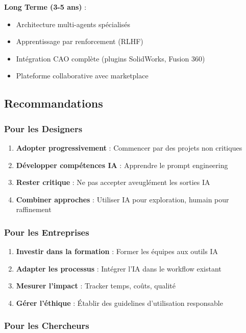 \textbf{Long Terme (3-5 ans)} :
\begin{itemize}[leftmargin=*]
    \item Architecture multi-agents spécialisés
    \item Apprentissage par renforcement (RLHF)
    \item Intégration CAO complète (plugins SolidWorks, Fusion 360)
    \item Plateforme collaborative avec marketplace
\end{itemize}

\subsection{Recommandations}

\subsubsection{Pour les Designers}

\begin{enumerate}[leftmargin=*]
    \item \textbf{Adopter progressivement} : Commencer par des projets non critiques
    \item \textbf{Développer compétences IA} : Apprendre le prompt engineering
    \item \textbf{Rester critique} : Ne pas accepter aveuglément les sorties IA
    \item \textbf{Combiner approches} : Utiliser IA pour exploration, humain pour raffinement
\end{enumerate}

\subsubsection{Pour les Entreprises}

\begin{enumerate}[leftmargin=*]
    \item \textbf{Investir dans la formation} : Former les équipes aux outils IA
    \item \textbf{Adapter les processus} : Intégrer l'IA dans le workflow existant
    \item \textbf{Mesurer l'impact} : Tracker temps, coûts, qualité
    \item \textbf{Gérer l'éthique} : Établir des guidelines d'utilisation responsable
\end{enumerate}

\subsubsection{Pour les Chercheurs}

